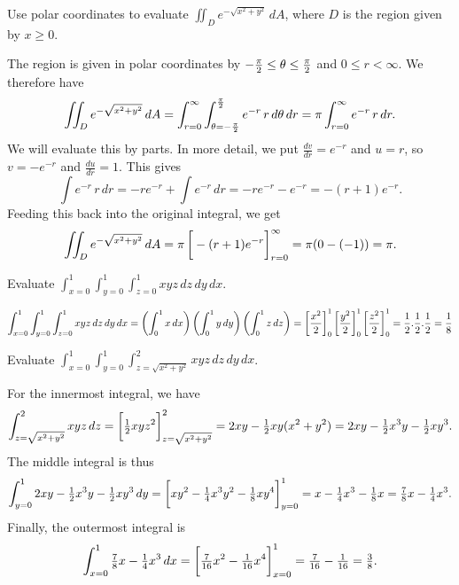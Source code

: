 \documentclass[a4paper]{amsart}
\renewenvironment{solution}{\SolutionInline}{\endSolutionInline}
\begin{document}
\begin{exercise}
 Use polar coordinates to evaluate 
 $\displaystyle \iint_D e^{-\sqrt{x^2+y^2}}\,dA$, where $D$ is the
 region given by $x\geq 0$.
\end{exercise}
\begin{solution}
 The region is given in polar coordinates by
 $-\frac{\pi}{2}\leq\theta\leq\frac{\pi}{2}$ and $0\leq r<\infty$.  We
 therefore have 
 \[ \iint_D e^{-\sqrt{x^2+y^2}}\,dA = 
      \int_{r=0}^\infty\int_{\theta=-\frac{\pi}{2}}^{\frac{\pi}{2}}
       e^{-r}\,r\,d\theta\,dr = 
    \pi \int_{r=0}^\infty e^{-r}\,r\,dr.
 \]
 We will evaluate this by parts.  In more detail, we put
 $\frac{dv}{dr}=e^{-r}$ and $u=r$, so $v=-e^{-r}$ and
 $\frac{du}{dr}=1$.  This gives 
 \[ \int e^{-r}\,r\,dr = -re^{-r} + \int e^{-r}\,dr = 
     -re^{-r}-e^{-r} = -(r+1)e^{-r}.
 \]
 Feeding this back into the original integral, we get
 \[ \iint_D e^{-\sqrt{x^2+y^2}}\,dA = 
     \pi \CH{-(r+1)e^{-r}}_{r=0}^\infty = 
      \pi (0-(-1)) = \pi.
 \]
\end{solution}

\begin{exercise}
 Evaluate
 $\displaystyle \int_{x=0}^1\int_{y=0}^1\int_{z=0}^1xyz\,dz\,dy\,dx$.
\end{exercise}
\begin{solution}
 \[ \int_{x=0}^1\int_{y=0}^1\int_{z=0}^1xyz\,dz\,dy\,dx = 
    \left(\int_0^1x\,dx\right)\left(\int_0^1y\,dy\right)\left(\int_0^1z\,dz\right)=
    \CH{\frac{x^2}{2}}_0^1 \CH{\frac{y^2}{2}}_0^1 \CH{\frac{z^2}{2}}_0^1 =
    \frac{1}{2}.\frac{1}{2}.\frac{1}{2} = \frac{1}{8}
 \]
\end{solution}

\begin{exercise}
 Evaluate
 $\displaystyle \int_{x=0}^1\int_{y=0}^1\int_{z=\sqrt{x^2+y^2}}^2xyz\,dz\,dy\,dx$.
\end{exercise}
\begin{solution}
 For the innermost integral, we have
 \[ \int_{z=\sqrt{x^2+y^2}}^2xyz\,dz = 
     \CH{\half xyz^2}_{z=\sqrt{x^2+y^2}}^2 = 
      2xy-\half xy(x^2+y^2) = 
      2xy-\half x^3y - \half xy^3.
 \]
 The middle integral is thus
 \[ \int_{y=0}^1 2xy-\half x^3y-\half xy^3 \,dy = 
     \CH{xy^2-\tfrac{1}{4}x^3y^2-\tfrac{1}{8}xy^4}_{y=0}^1 = 
      x - \tfrac{1}{4}x^3 - \tfrac{1}{8}x = 
      \tfrac{7}{8}x - \tfrac{1}{4}x^3.
 \]
 Finally, the outermost integral is 
 \[ \int_{x=0}^1 \tfrac{7}{8}x - \tfrac{1}{4}x^3\,dx = 
     \CH{\tfrac{7}{16}x^2 - \tfrac{1}{16}x^4}_{x=0}^1 = 
      \tfrac{7}{16}-\tfrac{1}{16} = \tfrac{3}{8}.
 \]
\end{solution}
\end{document}
